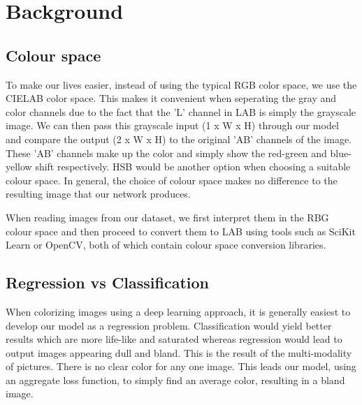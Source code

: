 \documentclass[conference]{IEEEtran}
\begin{document}
\section{Background}




\subsection{Colour space}

To make our lives easier, instead of using the typical RGB color space, we use the CIELAB color space. This makes it convenient when seperating the gray and color channels due to the fact that the 'L' channel in LAB is simply the grayscale image. We can then pass this grayscale input (1 x W x H) through our model and compare the output (2 x W x H) to the original 'AB' channels of the image. These 'AB' channels make up the color and simply show the red-green and blue-yellow shift respectively. HSB would be another option when choosing a suitable colour space. In general, the choice of colour space makes no difference to the resulting image that our network produces.

When reading images from our dataset, we first interpret them in the RBG colour space and then proceed to convert them to LAB using tools such as SciKit Learn or OpenCV, both of which contain colour space conversion libraries. 

\subsection{Regression vs Classification}

When colorizing images using a deep learning approach, it is generally easiest to develop our model as a regression problem. Classification would yield better results which are more life-like and saturated whereas regression would lead to output images appearing dull and bland. This is the result of the multi-modality of pictures. There is no clear color for any one image. This leads our model, using an aggregate loss function, to simply find an average color, resulting in a bland image.
\end{document}
